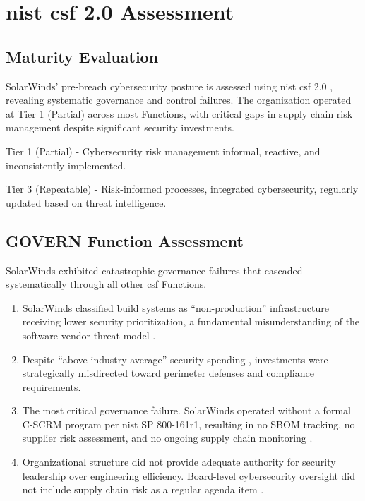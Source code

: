 \section{\gls{nist} \gls{csf} 2.0 Assessment}

\subsection{Maturity Evaluation}
SolarWinds' pre-breach cybersecurity posture is assessed using \gls{nist} \gls{csf} 2.0 \cite{pascoe2024}, revealing systematic governance and control failures. The organization operated at Tier 1 (Partial) across most Functions, with critical gaps in supply chain risk management despite significant security investments.

 Tier 1 (Partial) - Cybersecurity risk management informal, reactive, and inconsistently implemented.

 Tier 3 (Repeatable) - Risk-informed processes, integrated cybersecurity, regularly updated based on threat intelligence.

\subsection{GOVERN Function Assessment}
SolarWinds exhibited catastrophic governance failures that cascaded systematically through all other \gls{csf} Functions.

\begin{enumerate}
    \item {} SolarWinds classified build systems as ``non-production'' infrastructure receiving lower security prioritization, a fundamental misunderstanding of the software vendor threat model \cite{boyens2024}.
    \item {} Despite ``above industry average'' security spending \cite{nagle2023}, investments were strategically misdirected toward perimeter defenses and compliance requirements.
    \item {} The most critical governance failure. SolarWinds operated without a formal C-SCRM program per \gls{nist} SP 800-161r1, resulting in no SBOM tracking, no supplier risk assessment, and no ongoing supply chain monitoring \cite{boyens2024}.
    \item {} Organizational structure did not provide adequate authority for security leadership over engineering efficiency. Board-level cybersecurity oversight did not include supply chain risk as a regular agenda item \cite{nagle2023}.
\end{enumerate}

